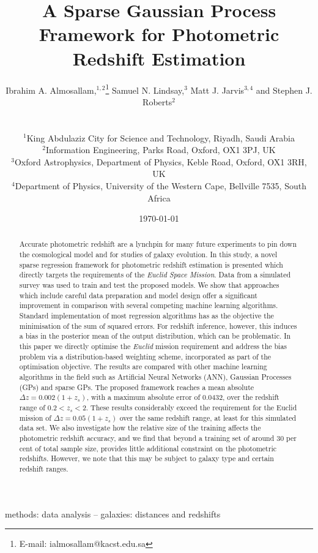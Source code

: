 \documentclass[useAMS,usenatbib,fleqn]{mn2e}
\title[A Sparse Gaussian Process Framework for Photometric Redshift Estimation]{A Sparse Gaussian Process Framework for Photometric Redshift Estimation}
\author[Almosallam et al.]
{\parbox{\textwidth}{Ibrahim A. Almosallam,$^{1,2}$\thanks{E-mail: ialmosallam@kacst.edu.sa} Samuel N. Lindsay,$^{3}$ Matt J. Jarvis$^{3,4}$ and Stephen J. Roberts$^{2}$
}
\vspace{0.4cm}\\
\parbox{\textwidth}{
$^1$King Abdulaziz City for Science and Technology, Riyadh, Saudi Arabia\\
$^2$Information Engineering, Parks Road, Oxford, OX1 3PJ, UK\\
$^3$Oxford Astrophysics, Department of Physics, Keble Road, Oxford, OX1 3RH, UK\\
$^4$Department of Physics, University of the Western Cape, Bellville 7535, South Africa\\
}}
\begin{document}
\date{\today}

\pagerange{\pageref{firstpage}--\pageref{lastpage}} 

\maketitle

\label{firstpage}

\begin{abstract}
Accurate photometric redshift are a lynchpin for many future experiments to pin down the cosmological model and for studies of galaxy evolution. In this study, a novel sparse regression framework for photometric redshift estimation is presented which directly targets the requirements of the {\em Euclid Space Mission}. Data from a simulated survey was used to train and test the proposed models. We show that approaches which include careful data preparation and model design offer a significant improvement in comparison with several competing machine learning algorithms. Standard implementation of most regression algorithms has as the objective the minimisation of the sum of squared errors. For redshift inference, however, this induces a bias in the posterior mean of the output distribution, which can be problematic. In this paper we directly optimise the {\em Euclid} mission requirement and address the bias problem via a distribution-based weighting scheme, incorporated as part of the optimisation objective. The results are compared with other machine learning algorithms in the field such as Artificial Neural Networks (ANN), Gaussian Processes (GPs) and sparse GPs. The proposed framework reaches a mean absolute $\Delta z = 0.002(1+z_{s})$, with a maximum absolute error of 0.0432, over the redshift range of $0.2 < z_{s} < 2$. These results considerably exceed the requirement for the Euclid mission of $\Delta z = 0.05(1+z_{s})$ over the same redshift range, at least for this simulated data set. We also investigate how the relative  size of the training affects the photometric redshift accuracy, and we find that beyond a training set of around 30 per cent of total sample size, provides little additional constraint on the photometric redshifts. However, we note that this may be subject to galaxy type and certain redshift ranges.
\end{abstract}

\begin{keywords}
methods: data analysis -- galaxies: distances and redshifts
\end{keywords}
\end{document}
